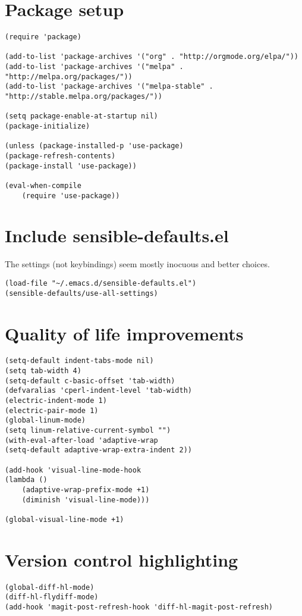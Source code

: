 \documentclass[11pt]{article}
\begin{document}
\section{Package setup}
\label{sec-4}
\begin{verbatim}
(require 'package)

(add-to-list 'package-archives '("org" . "http://orgmode.org/elpa/"))
(add-to-list 'package-archives '("melpa" . "http://melpa.org/packages/"))
(add-to-list 'package-archives '("melpa-stable" . "http://stable.melpa.org/packages/"))

(setq package-enable-at-startup nil)
(package-initialize)

(unless (package-installed-p 'use-package)
(package-refresh-contents)
(package-install 'use-package))

(eval-when-compile
    (require 'use-package))
\end{verbatim}

\section{Include sensible-defaults.el}
\label{sec-5}
The settings (not keybindings) seem mostly inocuous and better choices.
\begin{verbatim}
(load-file "~/.emacs.d/sensible-defaults.el")
(sensible-defaults/use-all-settings)
\end{verbatim}


\section{Quality of life improvements}
\label{sec-6}
\begin{verbatim}
(setq-default indent-tabs-mode nil)
(setq tab-width 4)
(setq-default c-basic-offset 'tab-width)
(defvaralias 'cperl-indent-level 'tab-width)
(electric-indent-mode 1)
(electric-pair-mode 1)
(global-linum-mode)
(setq linum-relative-current-symbol "")
(with-eval-after-load 'adaptive-wrap
(setq-default adaptive-wrap-extra-indent 2))

(add-hook 'visual-line-mode-hook
(lambda ()
    (adaptive-wrap-prefix-mode +1)
    (diminish 'visual-line-mode)))

(global-visual-line-mode +1)
\end{verbatim}


\section{Version control highlighting}
\label{sec-7}
\begin{verbatim}
(global-diff-hl-mode)
(diff-hl-flydiff-mode)
(add-hook 'magit-post-refresh-hook 'diff-hl-magit-post-refresh)
\end{verbatim}
\end{document}
